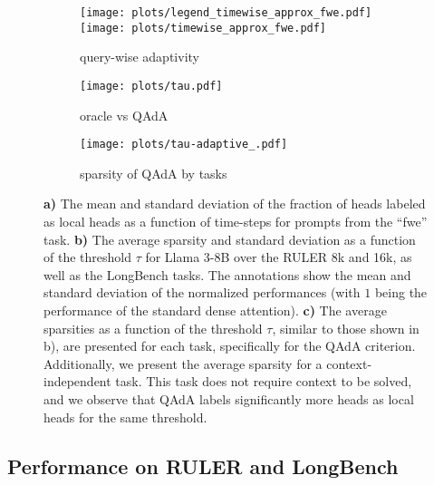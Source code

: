 \begin{figure*}
    \centering    
        \begin{subfigure}[b]{0.29\linewidth}
        \centering
\texttt{[image: plots/legend\_timewise\_approx\_fwe.pdf]}\\
\texttt{[image: plots/timewise\_approx\_fwe.pdf]}
        \caption{query-wise adaptivity}
        \label{fig:timewise-fwe}
    \end{subfigure}
\begin{subfigure}[b]{0.34\linewidth}
        \centering
        \texttt{[image: plots/tau.pdf]}
        \caption{oracle vs QAdA}
        \label{fig:threshold}
    \end{subfigure}
\begin{subfigure}[b]{0.34\linewidth}
        \centering
        \texttt{[image: plots/tau-adaptive\_.pdf]}
        \caption{sparsity of QAdA by tasks}
        \label{fig:threshold_per_task}
    \end{subfigure}
    \caption{\small 
    \textbf{a)} The mean and standard deviation of the fraction of heads labeled as local heads as a function of time-steps for prompts from the ``fwe'' task. 
   \textbf{ b)}  The average sparsity and standard deviation as a function of the threshold $\tau$ for Llama 3-8B over the RULER 8k and 16k, as well as the LongBench tasks. The annotations show the mean and standard deviation of the normalized performances (with $1$ being the performance of the standard dense attention). 
\textbf{c)} The average sparsities as a function of the threshold $\tau$, similar to those shown in b), are presented for each task, specifically for the QAdA criterion. Additionally, we present the average sparsity for a context-independent task. This task does not require context to be solved, and we observe that QAdA labels significantly more heads as local heads for the same threshold.} 
\end{figure*}








\vspace{-0.1in}
\subsection{Performance on RULER and LongBench}
\label{sec:downstream_analysis}
